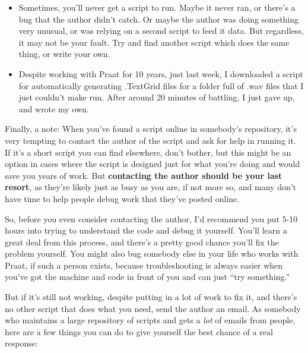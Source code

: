 \documentclass[11pt]{article}
\def\tightlist{}
\begin{document}
\begin{enumerate}
  \begin{itemize}
  \tightlist
  \item
    Sometimes, you'll never get a script to run. Maybe it never ran, or
    there's a bug that the author didn't catch. Or maybe the author was
    doing something very unusual, or was relying on a second script to
    feed it data. But regardless, it may not be your fault. Try and find
    another script which does the same thing, or write your own.
  \item
    Despite working with Praat for 10 years, just last week, I
    downloaded a script for automatically generating .TextGrid files for
    a folder full of .wav files that I just couldn't make run. After
    around 20 minutes of battling, I just gave up, and wrote my own.
  \end{itemize}
\end{enumerate}

Finally, a note: When you've found a script online in somebody's
repository, it's very tempting to contact the author of the script and
ask for help in running it. If it's a short script you can find
elsewhere, don't bother, but this might be an option in cases where the
script is designed just for what you're doing and would save you years
of work. But \textbf{contacting the author should be your last resort},
as they're likely just as busy as you are, if not more so, and many
don't have time to help people debug work that they've posted online.

So, before you even consider contacting the author, I'd recommend you
put 5-10 hours into trying to understand the code and debug it yourself.
You'll learn a great deal from this process, and there's a pretty good
chance you'll fix the problem yourself. You might also bug somebody else
in your life who works with Praat, if such a person exists, because
troubleshooting is always easier when you've got the machine and code in
front of you and can just ``try something.''

But if it's still not working, despite putting in a lot of work to fix
it, and there's no other script that does what you need, send the author
an email. As somebody who maintains a large repository of scripts and
gets a \emph{lot} of emails from people, here are a few things you can
do to give yourself the best chance of a real response:
\end{document}
